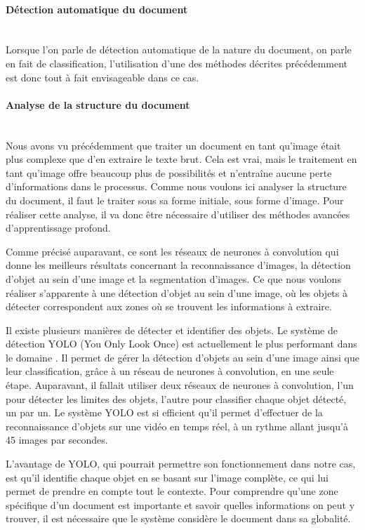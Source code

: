 \paragraph*{Détection automatique du document}
~\\

Lorsque l'on parle de détection automatique de la nature du document, on parle en fait de classification, l'utilisation d'une des méthodes décrites précédemment est donc tout à fait envisageable dans ce cas.

\paragraph*{Analyse de la structure du document}
~\\

Nous avons vu précédemment que traiter un document en tant qu'image était plus complexe que d'en extraire le texte brut.
Cela est vrai, mais le traitement en tant qu'image offre beaucoup plus de possibilités et n'entraîne aucune perte d'informations dans le processus.
Comme nous voulons ici analyser la structure du document, il faut le traiter sous sa forme initiale, sous forme d'image.
Pour réaliser cette analyse, il va donc être nécessaire d'utiliser des méthodes avancées d'apprentissage profond.

Comme précisé auparavant, ce sont les réseaux de neurones à convolution qui donne les meilleurs résultats concernant la reconnaissance d'images, la détection d'objet au sein d'une image et la segmentation d'images.
Ce que nous voulons réaliser s'apparente à une détection d'objet au sein d'une image, où les objets à détecter correspondent aux zones où se trouvent les informations à extraire.

Il existe plusieurs manières de détecter et identifier des objets.
Le système de détection YOLO (You Only Look Once) est actuellement le plus performant dans le domaine \cite{yolo}.
Il permet de gérer la détection d'objets au sein d'une image ainsi que leur classification, grâce à un réseau de neurones à convolution, en une seule étape.
Auparavant, il fallait utiliser deux réseaux de neurones à convolution, l'un pour détecter les limites des objets, l'autre pour classifier chaque objet détecté, un par un.
Le système YOLO est si efficient qu'il permet d'effectuer de la reconnaissance d'objets sur une vidéo en temps réel, à un rythme allant jusqu'à 45 images par secondes.

L'avantage de YOLO, qui pourrait permettre son fonctionnement dans notre cas, est qu'il identifie chaque objet en se basant sur l'image complète, ce qui lui permet de prendre en compte tout le contexte.
Pour comprendre qu'une zone spécifique d'un document est importante et savoir quelles informations on peut y trouver, il est nécessaire que le système considère le document dans sa globalité.

